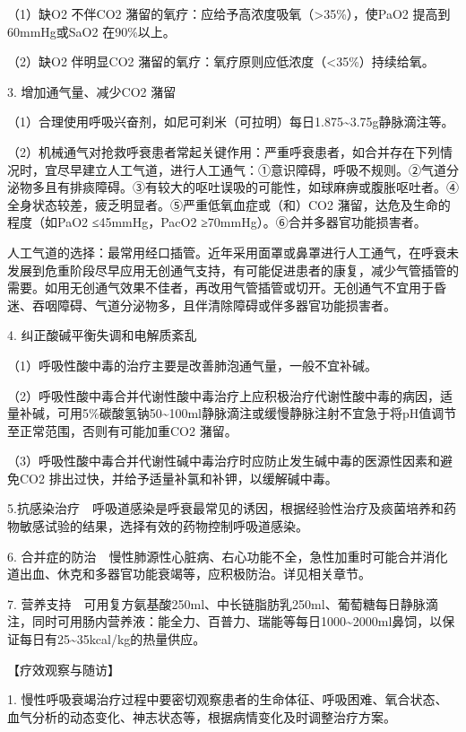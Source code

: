 （1）缺O{2} 不伴CO{2}
潴留的氧疗：应给予高浓度吸氧（\textgreater{}35\%），使PaO{2}
提高到60mmHg或SaO{2} 在90\%以上。

（2）缺O{2} 伴明显CO{2}
潴留的氧疗：氧疗原则应低浓度（\textless{}35\%）持续给氧。

3. 增加通气量、减少CO{2} 潴留

（1）合理使用呼吸兴奋剂，如尼可刹米（可拉明）每日1.875\textasciitilde{}3.75g静脉滴注等。

（2）机械通气对抢救呼衰患者常起关键作用：严重呼衰患者，如合并存在下列情况时，宜尽早建立人工气道，进行人工通气：①意识障碍，呼吸不规则。②气道分泌物多且有排痰障碍。③有较大的呕吐误吸的可能性，如球麻痹或腹胀呕吐者。④全身状态较差，疲乏明显者。⑤严重低氧血症或（和）CO{2}
潴留，达危及生命的程度（如PaO{2} ≤45mmHg，PacO{2}
≥70mmHg）。⑥合并多器官功能损害者。

人工气道的选择：最常用经口插管。近年采用面罩或鼻罩进行人工通气，在呼衰未发展到危重阶段尽早应用无创通气支持，有可能促进患者的康复，减少气管插管的需要。如用无创通气效果不佳者，再改用气管插管或切开。无创通气不宜用于昏迷、吞咽障碍、气道分泌物多，且伴清除障碍或伴多器官功能损害者。

4. 纠正酸碱平衡失调和电解质紊乱

（1）呼吸性酸中毒的治疗主要是改善肺泡通气量，一般不宜补碱。

（2）呼吸性酸中毒合并代谢性酸中毒治疗上应积极治疗代谢性酸中毒的病因，适量补碱，可用5\%碳酸氢钠50\textasciitilde{}100ml静脉滴注或缓慢静脉注射不宜急于将pH值调节至正常范围，否则有可能加重CO{2}
潴留。

（3）呼吸性酸中毒合并代谢性碱中毒治疗时应防止发生碱中毒的医源性因素和避免CO{2}
排出过快，并给予适量补氯和补钾，以缓解碱中毒。

5.抗感染治疗　呼吸道感染是呼衰最常见的诱因，根据经验性治疗及痰菌培养和药物敏感试验的结果，选择有效的药物控制呼吸道感染。

6.
合并症的防治　慢性肺源性心脏病、右心功能不全，急性加重时可能合并消化道出血、休克和多器官功能衰竭等，应积极防治。详见相关章节。

7.
营养支持　可用复方氨基酸250ml、中长链脂肪乳250ml、葡萄糖每日静脉滴注，同时可用肠内营养液：能全力、百普力、瑞能等每日1000\textasciitilde{}2000ml鼻饲，以保证每日有25\textasciitilde{}35kcal/kg的热量供应。

【疗效观察与随访】

1.
慢性呼吸衰竭治疗过程中要密切观察患者的生命体征、呼吸困难、氧合状态、血气分析的动态变化、神志状态等，根据病情变化及时调整治疗方案。

